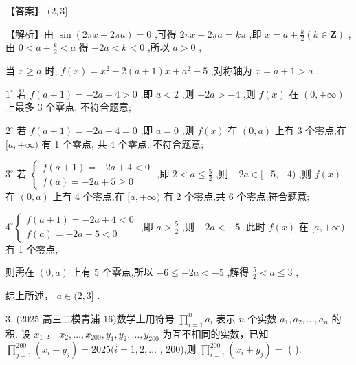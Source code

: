 \documentclass[10pt]{article}
\begin{document}
【答案】 \((2,3\rbrack\)

【解析】由 \(\sin \left( {{2\pi x} - {2\pi a}}\right)  = 0\) ,可得 \({2\pi x} - {2\pi a} = {k\pi }\) ,即 \(x = a + \frac{k}{2}\left( {k \in  \mathbf{Z}}\right)\) , 由 \(0 < a + \frac{k}{2} < a\) 得 \(- {2a} < k < 0\) ,所以 \(a > 0\) ,

当 \(x \geq  a\) 时, \(f\left( x\right)  = {x}^{2} - 2\left( {a + 1}\right) x + {a}^{2} + 5\) ,对称轴为 \(x = a + 1 > a\) ,

\({1}^{ \circ  }\) 若 \(f\left( {a + 1}\right)  =  - {2a} + 4 > 0\) ,即 \(a < 2\) ,则 \(- {2a} >  - 4\) ,则 \(f\left( x\right)\) 在 \(\left( {0, + \infty }\right)\) 上最多 3 个零点, 不符合题意;

\({2}^{ \circ  }\) 若 \(f\left( {a + 1}\right)  =  - {2a} + 4 = 0\) ,即 \(a = 0\) ,则 \(f\left( x\right)\) 在 \(\left( {0,a}\right)\) 上有 3 个零点,在 \(\lbrack a, + \infty )\) 有 1 个零点, 共 4 个零点, 不符合题意;

\({3}^{ \circ  }\) 若 \(\left\{  \begin{array}{l} f\left( {a + 1}\right)  =  - {2a} + 4 < 0 \\  f\left( a\right)  =  - {2a} + 5 \geq  0 \end{array}\right.\) ,即 \(2 < a \leq  \frac{5}{2}\) ,则 \(- {2a} \in  \lbrack  - 5, - 4)\) ,则 \(f\left( x\right)\) 在 \(\left( {0,a}\right)\) 上有 4 个零点,在 \(\lbrack a, + \infty )\) 有 2 个零点,共 6 个零点,符合题意;

\({4}^{ \circ  }\left\{  \begin{array}{l} f\left( {a + 1}\right)  =  - {2a} + 4 < 0 \\  f\left( a\right)  =  - {2a} + 5 < 0 \end{array}\right.\) ,即 \(a > \frac{5}{2}\) ,则 \(- {2a} <  - 5\) ,此时 \(f\left( x\right)\) 在 \(\lbrack a, + \infty )\) 有 1 个零点,

则需在 \(\left( {0,a}\right)\) 上有 5 个零点,所以 \(- 6 \leq   - {2a} <  - 5\) ,解得 \(\frac{5}{2} < a \leq  3\) ,

综上所述， \(a \in  (2,3\rbrack\) .

3. (2025 高三二模青浦 16)数学上用符号 \(\mathop{\prod }\limits_{{i = 1}}^{n}{a}_{i}\) 表示 \(n\) 个实数 \({a}_{1},{a}_{2},\ldots ,{a}_{n}\) 的积. 设 \({x}_{1}\) ， \({x}_{2},\ldots ,{x}_{200},{y}_{1},{y}_{2},\ldots ,{y}_{200}\) 为互不相同的实数，已知 \(\mathop{\prod }\limits_{{j = 1}}^{{200}}\left( {{x}_{i} + {y}_{j}}\right)  = {2025}(i = 1,2,\ldots\) , 200),则 \(\mathop{\prod }\limits_{{i = 1}}^{{200}}\left( {{x}_{i} + {y}_{j}}\right)  =\) (   ).
\end{document}
